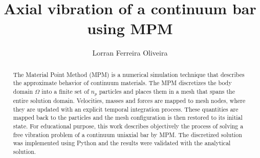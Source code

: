 \documentclass[preprint,12pt]{elsarticle}
\begin{document}
	
	\begin{frontmatter}
		
		
		
		\title{Axial vibration of a continuum bar using MPM}
		
		
		\author[inst1]{Lorran Ferreira Oliveira}
		
		
		\begin{abstract}
			The Material Point Method (MPM) is a numerical simulation technique that describes the approximate behavior of continuum materials. The MPM discretizes the body domain $\Omega$ into a finite set of $n_p$ particles and places them in a mesh that spans the entire solution domain. Velocities, masses and forces are mapped to mesh nodes, where they are updated with an explicit temporal integration process. These quantities are mapped back to the particles and the mesh configuration is then restored to its initial state. For educational purpose, this work describes objectively the process of solving a free vibration problem of a continuum uniaxial bar by MPM. The discretized solution was implemented using Python and the results were validated with the analytical solution.
		\end{abstract}
		

\end{frontmatter}
\end{document}
